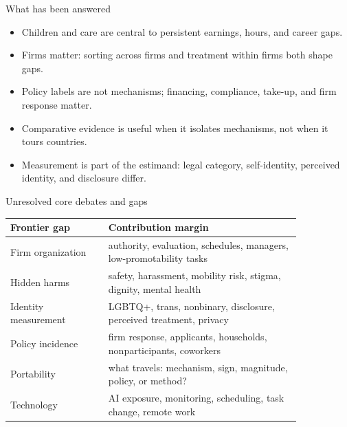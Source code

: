 \documentclass[aspectratio=169,11pt]{beamer}
\begin{document}
\begin{frame}{What has been answered}
\begin{itemize}
    \item Children and care are central to persistent earnings, hours, and career gaps.
    \item Firms matter: sorting across firms and treatment within firms both shape gaps.
    \item Policy labels are not mechanisms; financing, compliance, take-up, and firm response matter.
    \item Comparative evidence is useful when it isolates mechanisms, not when it tours countries.
    \item Measurement is part of the estimand: legal category, self-identity, perceived identity, and disclosure differ.
\end{itemize}
\end{frame}

\begin{frame}{Unresolved core debates and gaps}
\scriptsize
\begin{tabular}{p{0.29\linewidth} p{0.55\linewidth}}
\toprule
Frontier gap & Contribution margin \\
\midrule
Firm organization & authority, evaluation, schedules, managers, low-promotability tasks \\
Hidden harms & safety, harassment, mobility risk, stigma, dignity, mental health \\
Identity measurement & LGBTQ+, trans, nonbinary, disclosure, perceived treatment, privacy \\
Policy incidence & firm response, applicants, households, nonparticipants, coworkers \\
Portability & what travels: mechanism, sign, magnitude, policy, or method? \\
Technology & AI exposure, monitoring, scheduling, task change, remote work \\
\bottomrule
\end{tabular}
\end{frame}
\end{document}
